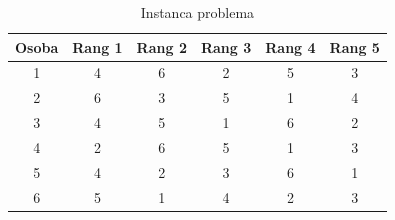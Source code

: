 \documentclass[a4paper]{article}
\begin{document}
\begin{table}[h]
    \centering
    \begin{tabular}{|c|c|c|c|c|c|}
        \hline
        Osoba & Rang 1 & Rang 2 & Rang 3 & Rang 4 & Rang 5 \\ \hline
        1 & 4 & 6 & 2 & 5 & 3 \\ \hline
        2 & 6 & 3 & 5 & 1 & 4 \\ \hline
        3 & 4 & 5 & 1 & 6 & 2 \\ \hline
        4 & 2 & 6 & 5 & 1 & 3 \\ \hline
        5 & 4 & 2 & 3 & 6 & 1 \\ \hline
        6 & 5 & 1 & 4 & 2 & 3 \\ \hline
    \end{tabular}
    \caption{Instanca problema}
    \label{instanca}
\end{table}
\end{document}
